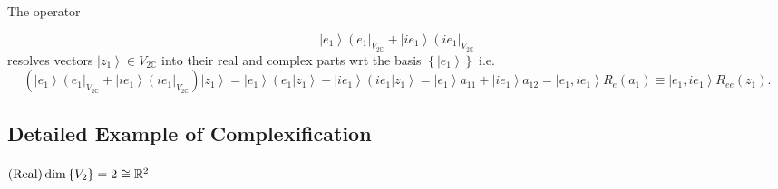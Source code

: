 \documentclass[aps,preprint]{revtex4}%
\begin{document}
The operator%

\begin{equation}
\left\vert e_{1}\right\rangle \left(  e_{1}\right\vert _{V_{2\mathbb{C}}%
}+\left\vert ie_{1}\right\rangle \left(  ie_{1}\right\vert _{V_{2\mathbb{C}}}%
\end{equation}
resolves vectors $\left\vert z_{1}\right\rangle \in V_{2\mathbb{C}}$ into
their real and complex parts wrt the basis $\left\{  \left\vert e_{1}%
\right\rangle \right\}  $ i.e.
\begin{equation}
\left(  \left\vert e_{1}\right\rangle \left(  e_{1}\right\vert
_{V_{2\mathbb{C}}}+\left\vert ie_{1}\right\rangle \left(  ie_{1}\right\vert
_{V_{2\mathbb{C}}}\right)  \left\vert z_{1}\right\rangle =\left\vert
e_{1}\right\rangle \left(  \left.  e_{1}\right\vert z_{1}\right\rangle
+\left\vert ie_{1}\right\rangle \left(  \left.  ie_{1}\right\vert
z_{1}\right\rangle =\left\vert e_{1}\right\rangle a_{11}+\left\vert
ie_{1}\right\rangle a_{12}=\left\vert e_{1},ie_{1}\right\rangle R_{e}\left(
a_{1}\right)  \equiv\left\vert e_{1},ie_{1}\right\rangle R_{ee}\left(
z_{1}\right)  .
\end{equation}


\subsection{Detailed Example of Complexification}

\paragraph{$\left(  \text{Real}\right)  \dim\left\{  V_{2}\right\}
=2\protect\cong\mathbb{R}^{2}$}
\end{document}
